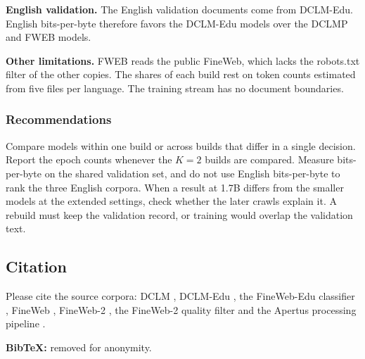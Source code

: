 \textbf{English validation.} The English validation documents come from DCLM-Edu. English bits-per-byte therefore favors the DCLM-Edu models over the DCLMP and FWEB models.

\textbf{Other limitations.} FWEB reads the public FineWeb, which lacks the robots.txt filter of the other copies. The shares of each build rest on token counts estimated from five files per language. The training stream has no document boundaries.

\subsubsection*{Recommendations}

Compare models within one build or across builds that differ in a single decision. Report the epoch counts whenever the $K=2$ builds are compared. Measure bits-per-byte on the shared validation set, and do not use English bits-per-byte to rank the three English corpora. When a result at 1.7B differs from the smaller models at the extended settings, check whether the later crawls explain it. A rebuild must keep the validation record, or training would overlap the validation text.

\subsection*{Citation}

Please cite the source corpora: DCLM \citep{li_datacomp-lm_2025}, DCLM-Edu \citep{allal_smollm2_2025}, the FineWeb-Edu classifier \citep{lozhkov_fineweb-edu_2024}, FineWeb \citep{penedo_fineweb_2024}, FineWeb-2 \citep{penedo_fineweb2_2025}, the FineWeb-2 quality filter \citep{messmer_enhancing_2026} and the Apertus processing pipeline \citep{apertus_apertus_2025}.

\textbf{BibTeX:} removed for anonymity.
